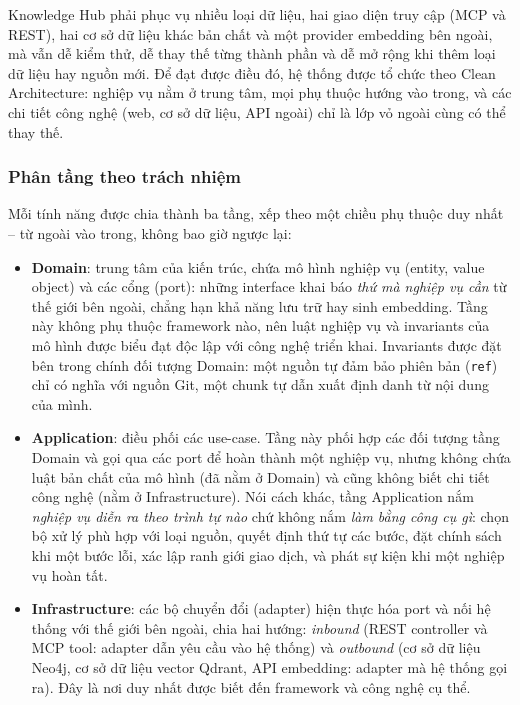 Knowledge Hub phải phục vụ nhiều loại dữ liệu, hai giao diện truy cập (MCP và REST), hai cơ sở dữ liệu khác bản chất và một provider embedding bên ngoài, mà vẫn dễ kiểm thử, dễ thay thế từng thành phần và dễ mở rộng khi thêm loại dữ liệu hay nguồn mới. Để đạt được điều đó, hệ thống được tổ chức theo Clean Architecture: nghiệp vụ nằm ở trung tâm, mọi phụ thuộc hướng vào trong, và các chi tiết công nghệ (web, cơ sở dữ liệu, API ngoài) chỉ là lớp vỏ ngoài cùng có thể thay thế.

\subsubsection{Phân tầng theo trách nhiệm}

Mỗi tính năng được chia thành ba tầng, xếp theo một chiều phụ thuộc duy nhất -- từ ngoài vào trong, không bao giờ ngược lại:

\begin{itemize}
  \item \textbf{Domain}: trung tâm của kiến trúc, chứa mô hình nghiệp vụ (entity, value object) và các cổng (port): những interface khai báo \textit{thứ mà nghiệp vụ cần} từ thế giới bên ngoài, chẳng hạn khả năng lưu trữ hay sinh embedding. Tầng này không phụ thuộc framework nào, nên luật nghiệp vụ và invariants của mô hình được biểu đạt độc lập với công nghệ triển khai. Invariants được đặt bên trong chính đối tượng Domain: một nguồn tự đảm bảo phiên bản (\texttt{ref}) chỉ có nghĩa với nguồn Git, một chunk tự dẫn xuất định danh từ nội dung của mình.
  \item \textbf{Application}: điều phối các use-case. Tầng này phối hợp các đối tượng tầng Domain và gọi qua các port để hoàn thành một nghiệp vụ, nhưng không chứa luật bản chất của mô hình (đã nằm ở Domain) và cũng không biết chi tiết công nghệ (nằm ở Infrastructure). Nói cách khác, tầng Application nắm \textit{nghiệp vụ diễn ra theo trình tự nào} chứ không nắm \textit{làm bằng công cụ gì}: chọn bộ xử lý phù hợp với loại nguồn, quyết định thứ tự các bước, đặt chính sách khi một bước lỗi, xác lập ranh giới giao dịch, và phát sự kiện khi một nghiệp vụ hoàn tất.
  \item \textbf{Infrastructure}: các bộ chuyển đổi (adapter) hiện thực hóa port và nối hệ thống với thế giới bên ngoài, chia hai hướng: \textit{inbound} (REST controller và MCP tool: adapter dẫn yêu cầu vào hệ thống) và \textit{outbound} (cơ sở dữ liệu Neo4j, cơ sở dữ liệu vector Qdrant, API embedding: adapter mà hệ thống gọi ra). Đây là nơi duy nhất được biết đến framework và công nghệ cụ thể.
\end{itemize}

